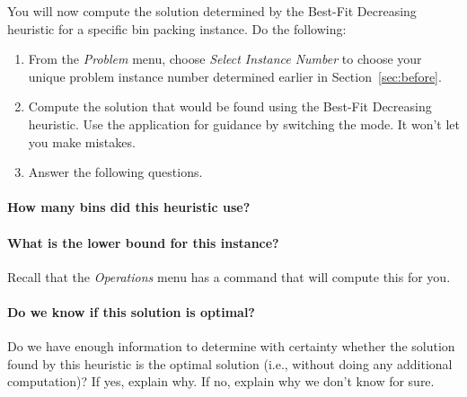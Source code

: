 \documentclass[11pt,letterpaper]{article}
\begin{document}
You will now compute the solution determined by the Best-Fit Decreasing
heuristic for a specific bin packing instance. Do the following:
\begin{enumerate}[leftmargin=*, parsep=0pt, itemsep=2pt, topsep=2pt, partopsep=0pt]
\item From the {\em Problem} menu, choose {\em Select Instance Number}
to choose your unique problem instance number determined earlier in 
Section~\ref{sec:before}.
\item Compute the solution that would be found using the Best-Fit Decreasing
heuristic. Use the application for guidance by switching the mode.
It won't let you make mistakes.
\item Answer the following questions.
\end{enumerate}

\vspace*{-0.25in}

\paragraph*{How many bins did this heuristic use?}

\vspace*{0.25in}

\paragraph*{What is the lower bound for this instance?} Recall that the
{\em Operations} menu has a command that will compute this for you.

\vspace*{0.25in}

\paragraph*{Do we know if this solution is optimal?} Do we have enough 
information to determine with certainty whether the solution found by
this heuristic is the optimal solution (i.e., without doing any additional
computation)? If yes, explain why. If no, explain why we don't know for sure.

\vspace*{0.5in}
\end{document}
